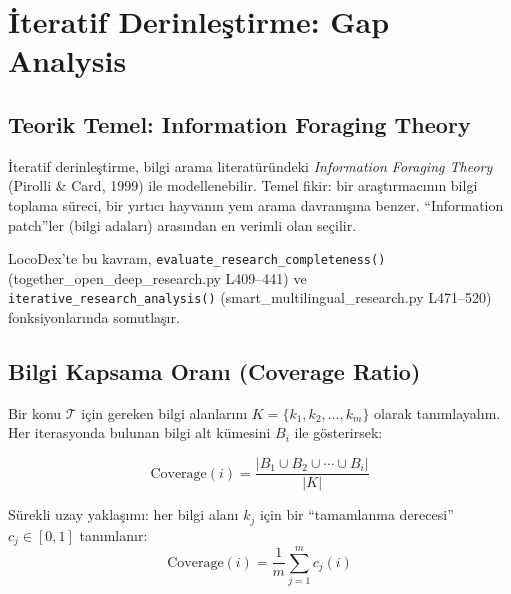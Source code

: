 \section{\.{I}teratif Derinle\c{s}tirme: Gap Analysis}
\label{sec:iterative_deepening}

\subsection{Teorik Temel: Information Foraging Theory}

\.{I}teratif derinle\c{s}tirme, bilgi arama literat\"{u}r\"{u}ndeki \emph{Information Foraging Theory} (Pirolli \& Card, 1999) ile modellenebilir. Temel fikir: bir ara\c{s}t{\i}rmac{\i}n{\i}n bilgi toplama s\"{u}reci, bir y{\i}rt{\i}c{\i} hayvan{\i}n yem arama davran{\i}\c{s}{\i}na benzer. ``Information patch''ler (bilgi adalar{\i}) aras{\i}ndan en verimli olan se\c{c}ilir.

LocoDex'te bu kavram, \texttt{evaluate\_research\_completeness()} (together\_open\_deep\_research.py L409--441) ve \texttt{iterative\_research\_analysis()} (smart\_multilingual\_research.py L471--520) fonksiyonlar{\i}nda somutla\c{s}{\i}r.

\subsection{Bilgi Kapsama Oran{\i} (Coverage Ratio)}

Bir konu $\mathcal{T}$ i\c{c}in gereken bilgi alanlar{\i}n{\i} $K = \{k_1, k_2, \ldots, k_m\}$ olarak tan{\i}mlayal{\i}m. Her iterasyonda bulunan bilgi alt k\"{u}mesini $B_i$ ile g\"{o}sterirsek:

\begin{formulbox}
\begin{equation}
\label{eq:coverage_set}
\text{Coverage}(i) = \frac{|B_1 \cup B_2 \cup \cdots \cup B_i|}{|K|}
\end{equation}

S\"{u}rekli uzay yakla\c{s}{\i}m{\i}: her bilgi alan{\i} $k_j$ i\c{c}in bir ``tamamlanma derecesi'' $c_j \in [0,1]$ tan{\i}mlan{\i}r:
\begin{equation}
\label{eq:coverage_vec}
\text{Coverage}(i) = \frac{1}{m} \sum_{j=1}^{m} c_j(i)
\end{equation}
\end{formulbox}

